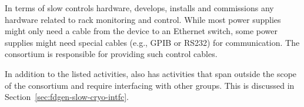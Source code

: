 In terms of slow controls hardware,   develops, installs and
commissions any hardware related to rack monitoring and control. While
most power supplies might only need a cable from the device to an
Ethernet switch, some power supplies might need special cables (e.g., 
GPIB or RS232) for communication. The  consortium is responsible for
providing such control cables.

In addition to the listed activities,  also has activities that span
outside the scope of the consortium and require interfacing with other
groups. This is discussed in Section~\ref{sec:fdgen-slow-cryo-intfc}.

